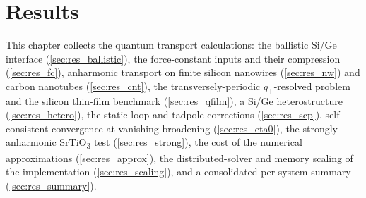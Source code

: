 \chapter{Results}
\label{sec:results}

This chapter collects the quantum transport calculations: the ballistic Si/Ge
interface (\cref{sec:res_ballistic}), the force-constant inputs and their
compression (\cref{sec:res_fc}), anharmonic transport on finite silicon
nanowires (\cref{sec:res_nw}) and carbon nanotubes (\cref{sec:res_cnt}), the
transversely-periodic $q_\perp$-resolved problem and the silicon thin-film
benchmark (\cref{sec:res_qfilm}), a Si/Ge heterostructure (\cref{sec:res_hetero}),
the static loop and tadpole corrections (\cref{sec:res_scp}), self-consistent
convergence at vanishing broadening (\cref{sec:res_eta0}), the strongly
anharmonic SrTiO\textsubscript{3} test (\cref{sec:res_strong}), the cost of the
numerical approximations (\cref{sec:res_approx}), the distributed-solver and
memory scaling of the implementation (\cref{sec:res_scaling}), and a
consolidated per-system summary (\cref{sec:res_summary}).












